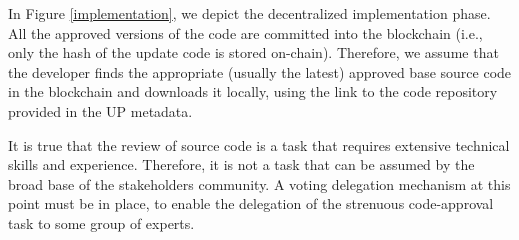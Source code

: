 
In Figure \ref{implementation}, we depict the decentralized implementation phase. All the approved versions of the code are committed into the blockchain (i.e., only the hash of the update code is stored on-chain). Therefore, we assume that the developer finds the appropriate (usually the latest) approved base source code in the blockchain and downloads it locally, using the link to the %
 code repository provided in the UP metadata. %

It is true that the review of source code is a task that requires extensive technical skills and experience. Therefore, it is not a task that can be assumed by the broad base of the stakeholders community. A voting delegation mechanism at this point must be in place, to enable the delegation of the strenuous code-approval task to some group of experts. 

